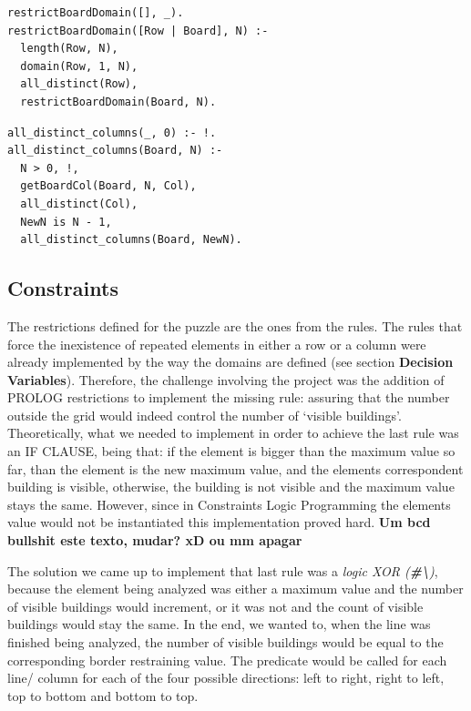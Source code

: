 \documentclass{llncs}
\begin{document}
\noindent\begin{minipage}{.44\textwidth}
\begin{lstlisting}[frame= tblr, caption=Row domain restrictions]
restrictBoardDomain([], _).
restrictBoardDomain([Row | Board], N) :-
  length(Row, N),
  domain(Row, 1, N),
  all_distinct(Row),
  restrictBoardDomain(Board, N).
\end{lstlisting}
\end{minipage}\hfill
\begin{minipage}{.5\textwidth}
\begin{lstlisting}[frame=tblr, caption=Column all elements distinct]
all_distinct_columns(_, 0) :- !.
all_distinct_columns(Board, N) :-
  N > 0, !,
  getBoardCol(Board, N, Col),
  all_distinct(Col),
  NewN is N - 1,
  all_distinct_columns(Board, NewN).
\end{lstlisting}
\end{minipage}\hfill

%
\subsection{Constraints}

The restrictions defined for the puzzle are the ones from the rules. The rules that force the inexistence of repeated elements in either a row or a column were already implemented by the way the domains are defined (see section \textbf{Decision Variables}). Therefore, the challenge involving the project was the addition of PROLOG restrictions to implement the missing rule: assuring that the number outside the grid would indeed control the number of `visible buildings'.\\

Theoretically, what we needed to implement in order to achieve the last rule was an IF CLAUSE, being that: if the element is bigger than the maximum value so far, than the element is the new maximum value, and the elements correspondent building is visible, otherwise, the building is not visible and the maximum value stays the same. However, since in Constraints  Logic Programming the elements value would not be instantiated this implementation proved hard. \textbf{Um bcd bullshit este texto, mudar? xD ou mm apagar}

The solution we came up to implement that last rule was a \textit{logic XOR (\textbf{\#\textbackslash})}, because the element being analyzed was either a maximum value and the number of visible buildings would increment, or it was not and the count of visible buildings would stay the same. In the end, we wanted to, when the line was finished being analyzed, the number of visible buildings would be equal to the corresponding border restraining value. The predicate would be called for each line/ column for each of the four possible directions: left to right, right to left, top to bottom and bottom to top. 
\end{document}
